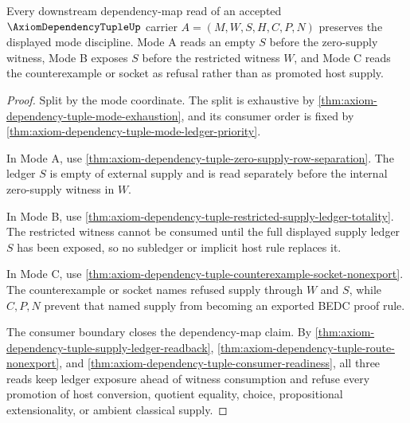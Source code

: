 \begin{theorem}
\label{thm:axiom-dependency-tuple-dependency-map-soundness}
Every downstream dependency-map read of an accepted
$\AxiomDependencyTupleUp$ carrier $A=(M,W,S,H,C,P,N)$ preserves the displayed
mode discipline. Mode A reads an empty $S$ before the zero-supply witness,
Mode B exposes $S$ before the restricted witness $W$, and Mode C reads the
counterexample or socket as refusal rather than as promoted host supply.
\end{theorem}
\begin{proof}
Split by the mode coordinate. The split is exhaustive by
\autoref{thm:axiom-dependency-tuple-mode-exhaustion}, and its consumer order is
fixed by \autoref{thm:axiom-dependency-tuple-mode-ledger-priority}.

In Mode A, use
\autoref{thm:axiom-dependency-tuple-zero-supply-row-separation}. The ledger
$S$ is empty of external supply and is read separately before the internal
zero-supply witness in $W$.

In Mode B, use
\autoref{thm:axiom-dependency-tuple-restricted-supply-ledger-totality}. The
restricted witness cannot be consumed until the full displayed supply ledger
$S$ has been exposed, so no subledger or implicit host rule replaces it.

In Mode C, use
\autoref{thm:axiom-dependency-tuple-counterexample-socket-nonexport}. The
counterexample or socket names refused supply through $W$ and $S$, while
$C,P,N$ prevent that named supply from becoming an exported BEDC proof rule.

The consumer boundary closes the dependency-map claim. By
\autoref{thm:axiom-dependency-tuple-supply-ledger-readback},
\autoref{thm:axiom-dependency-tuple-route-nonexport}, and
\autoref{thm:axiom-dependency-tuple-consumer-readiness}, all three reads keep
ledger exposure ahead of witness consumption and refuse every promotion of
host conversion, quotient equality, choice, propositional extensionality, or
ambient classical supply.
\end{proof}

